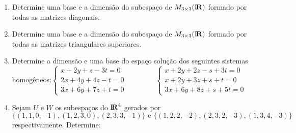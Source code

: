 \documentclass{report}
\begin{document}
\begin{Exercise}
\begin{enumerate}

\item \label{19lista3} Determine uma base e a dimens\~{a}o do
subespa\c{c}o de $M_{3\times
3}(%
\mbox{${\rm I}\!\mbox{\boldmath $ {\rm R}$}$}%
)$ formado por todas as matrizes diagonais.
%

\item \label{20lista3} Determine uma base e a dimens\~{a}o do
subespa\c{c}o de $M_{3\times
3}(%
\mbox{${\rm I}\!\mbox{\boldmath $ {\rm R}$}$}%
)$ formado por todas as matrizes triangulares superiores.


\item \label{21lista3} Determine a dimens\~{a}o e uma base do
espa\c{c}o solu\c{c}\~{a}o dos seguintes sistemas
homog\^{e}neos:\newline $\left\{
\begin{array}{l}
x+2y+z-3t=0 \\
2x+4y+4z-t=0 \\
3x+6y+7z+t=0
\end{array}
\right. \qquad \qquad \left\{
\begin{array}{l}
x+2y+2z-s+3t=0 \\
x+2y+3z+s+t=0 \\
3x+6y+8z+s+5t=0
\end{array}
\right. \quad $


\item \label{22lista3} Sejam $U$ e $W$ os subespa\c{c}os do $%
\mbox{${\rm I}\!\mbox{\boldmath $ {\rm R}$}$}%
^{4}$ gerados por
\[
\{(1,1,0,-1),(1,2,3,0),(2,3,3,-1)\}\text{ e }%
\{(1,2,2,-2),(2,3,2,-3),(1,3,4,-3)\}
\]
respectivamente. Determine:


\end{enumerate}
\end{Exercise}
\end{document}
